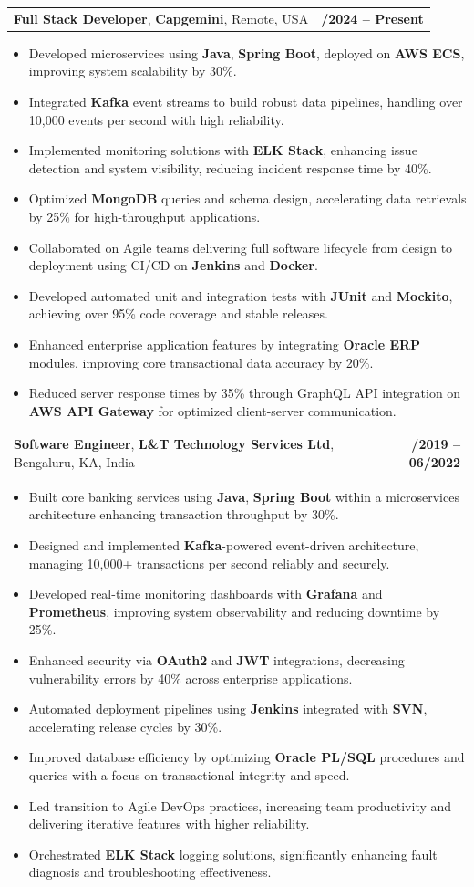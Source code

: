 \documentclass[letterpaper,11pt]{article}
\makeatletter
\newcommand{\resumeItem}[1]{
  \item\footnotesize{
    {#1 \vspace{-2pt}}
  }
}
\newcommand{\resumeSubheading}[4]{
  \vspace{-2pt}\item
    \begin{tabular*}{1.0\textwidth}[t]{l@{\extracolsep{\fill}}r}
      \textbf{\fontsize{10pt}{14pt}\selectfont #3}, \textbf{\fontsize{10pt}{14pt}\selectfont #1}, \fontsize{10pt}{14pt}\selectfont #4 & \textbf{\fontsize{10pt}{14pt}\selectfont #2} \\
    \end{tabular*}\vspace{-7pt}
}
\newcommand{\resumeItemListStart}{\begin{itemize}[leftmargin=*]}
\newcommand{\resumeItemListEnd}{\end{itemize}\vspace{-5pt}}
\makeatother
\begin{document}
    \resumeSubheading
        {Capgemini}{01/2024 -- Present}
        {Full Stack Developer}{Remote, USA}
      \resumeItemListStart
        \resumeItem{Developed microservices using \textbf{Java}, \textbf{Spring Boot}, deployed on \textbf{AWS ECS}, improving system scalability by 30\%.}
        \resumeItem{Integrated \textbf{Kafka} event streams to build robust data pipelines, handling over 10,000 events per second with high reliability.}
        \resumeItem{Implemented monitoring solutions with \textbf{ELK Stack}, enhancing issue detection and system visibility, reducing incident response time by 40\%.}
        \resumeItem{Optimized \textbf{MongoDB} queries and schema design, accelerating data retrievals by 25\% for high-throughput applications.}
        \resumeItem{Collaborated on Agile teams delivering full software lifecycle from design to deployment using CI/CD on \textbf{Jenkins} and \textbf{Docker}.}
        \resumeItem{Developed automated unit and integration tests with \textbf{JUnit} and \textbf{Mockito}, achieving over 95\% code coverage and stable releases.}
        \resumeItem{Enhanced enterprise application features by integrating \textbf{Oracle ERP} modules, improving core transactional data accuracy by 20\%.}
        \resumeItem{Reduced server response times by 35\% through GraphQL API integration on \textbf{AWS API Gateway} for optimized client-server communication.}
      \resumeItemListEnd

    \resumeSubheading
        {L\&T Technology Services Ltd}{08/2019 -- 06/2022}
        {Software Engineer}{Bengaluru, KA, India}
      \resumeItemListStart
        \resumeItem{Built core banking services using \textbf{Java}, \textbf{Spring Boot} within a microservices architecture enhancing transaction throughput by 30\%.}
        \resumeItem{Designed and implemented \textbf{Kafka}-powered event-driven architecture, managing 10,000+ transactions per second reliably and securely.}
        \resumeItem{Developed real-time monitoring dashboards with \textbf{Grafana} and \textbf{Prometheus}, improving system observability and reducing downtime by 25\%.}
        \resumeItem{Enhanced security via \textbf{OAuth2} and \textbf{JWT} integrations, decreasing vulnerability errors by 40\% across enterprise applications.}
        \resumeItem{Automated deployment pipelines using \textbf{Jenkins} integrated with \textbf{SVN}, accelerating release cycles by 30\%.}
        \resumeItem{Improved database efficiency by optimizing \textbf{Oracle PL/SQL} procedures and queries with a focus on transactional integrity and speed.}
        \resumeItem{Led transition to Agile DevOps practices, increasing team productivity and delivering iterative features with higher reliability.}
        \resumeItem{Orchestrated \textbf{ELK Stack} logging solutions, significantly enhancing fault diagnosis and troubleshooting effectiveness.}
      \resumeItemListEnd
\end{document}
